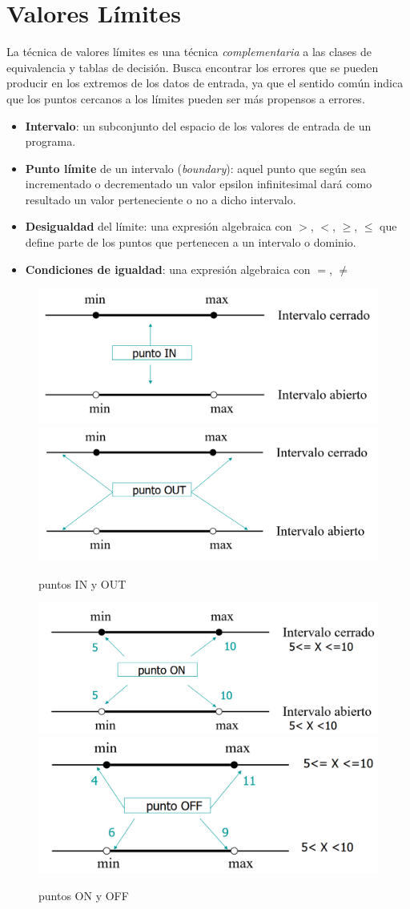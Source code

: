 \section{Valores Límites}
La técnica de valores límites es una técnica \textit{complementaria} a las clases de equivalencia y tablas de decisión.
Busca encontrar los errores que se pueden producir en los extremos de los datos de entrada, ya que el sentido común indica que los puntos cercanos a los límites pueden ser más propensos a errores.
\begin{itemize}
	\item \textbf{Intervalo}: un subconjunto del espacio de los valores de entrada de
un programa.
	\item \textbf{Punto límite} de un intervalo (\textit{boundary}): aquel punto que según
sea incrementado o decrementado un valor epsilon infinitesimal
dará como resultado un valor perteneciente o no a dicho intervalo.
	\item \textbf{Desigualdad} del límite: una expresión algebraica con $>$, $<$, $\geq$, $\leq$
que define parte de los puntos que pertenecen a un intervalo o
dominio.
	\item \textbf{Condiciones de igualdad}: una expresión algebraica con $=$, $\neq$
\end{itemize}

\begin{figure}[htbp]
   \centering
   \includegraphics[width=0.45\columnwidth]{images/05/puntoIN.png}
   \includegraphics[width=0.45\columnwidth]{images/05/puntoOUT.png}
   \caption{puntos IN y OUT}
   \label{fig:05/puntoINOUT}
\end{figure}
\begin{figure}[htbp]
   \centering
   \includegraphics[width=0.45\columnwidth]{images/05/puntoON.png}
   \includegraphics[width=0.45\columnwidth]{images/05/puntoOFF.png}
   \caption{puntos ON y OFF}
   \label{fig:05/puntoONOFF}
\end{figure}

